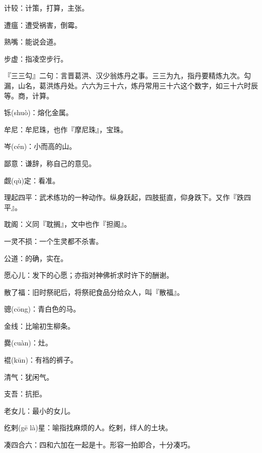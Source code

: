 \startbuffer[712]
计较：计策，打算，主张。
\stopbuffer


\startbuffer[713]
遭瘟：遭受祸害，倒霉。
\stopbuffer


\startbuffer[714]
熟嘴：能说会道。
\stopbuffer


\startbuffer[715]
步虚：指凌空步行。
\stopbuffer


\startbuffer[716]
『三三勾』二句：言晋葛洪、汉少翁炼丹之事。三三为九，指丹要精炼九次。勾漏，山名，葛洪炼丹处。六六为三十六，炼丹常用三十六这个数字，如三十六时辰等。商，计算。
\stopbuffer


\startbuffer[717]
铄(shuò)：熔化金属。
\stopbuffer


\startbuffer[718]
牟尼：牟尼珠，也作『摩尼珠』，宝珠。
\stopbuffer


\startbuffer[719]
岑(cén)：小而高的山。
\stopbuffer


\startbuffer[720]
鄙意：谦辞，称自己的意见。
\stopbuffer


\startbuffer[721]
觑(qù)定：看准。
\stopbuffer


\startbuffer[722]
理起四平：武术练功的一种动作。纵身跃起，四肢挺直，仰身跌下。又作『跌四平』。
\stopbuffer


\startbuffer[723]
耽阁：义同『耽搁』，文中也作『担阁』。
\stopbuffer


\startbuffer[724]
一灵不损：一个生灵都不杀害。
\stopbuffer


\startbuffer[725]
公道：的确，实在。
\stopbuffer


\startbuffer[726]
愿心儿：发下的心愿；亦指对神佛祈求时许下的酬谢。
\stopbuffer


\startbuffer[727]
散了福：旧时祭祀后，将祭祀食品分给众人，叫『散福』。
\stopbuffer


\startbuffer[728]
骢(cōng)：青白色的马。
\stopbuffer


\startbuffer[729]
金线：比喻初生柳条。
\stopbuffer


\startbuffer[730]
爨(cuàn)：灶。
\stopbuffer


\startbuffer[731]
裩(kūn)：有裆的裤子。
\stopbuffer


\startbuffer[732]
清气：犹闲气。
\stopbuffer


\startbuffer[733]
支吾：抗拒。
\stopbuffer


\startbuffer[734]
老女儿：最小的女儿。
\stopbuffer


\startbuffer[735]
纥剌(gē là)星：喻指找麻烦的人。纥剌，绊人的土块。
\stopbuffer


\startbuffer[736]
凑四合六：四和六加在一起是十。形容一拍即合，十分凑巧。
\stopbuffer


